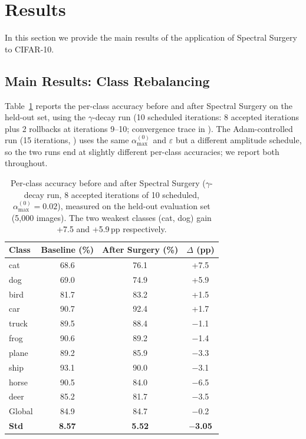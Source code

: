 \documentclass[11pt,a4paper]{article}
\begin{document}
\newpage

\section{Results}
\label{sec:results}

In this section we provide the main results of the application of Spectral Surgery to CIFAR-10.

\subsection{Main Results: Class Rebalancing}

Table~\ref{tab:main-results} reports the per-class accuracy before and
after Spectral Surgery on the held-out set, using the
$\gamma$-decay run (10 scheduled iterations: 8 accepted iterations
plus 2 rollbacks at iterations 9--10; convergence trace in
). The Adam-controlled run (15 iterations,
) uses the same $\alpha_{\max}^{(0)}$ and
$\varepsilon$ but a different amplitude schedule, so the two runs
end at slightly different per-class accuracies; we report both
throughout.

\begin{table}[ht]
\centering
\caption{Per-class accuracy before and after Spectral Surgery
($\gamma$-decay run, 8 accepted iterations of 10 scheduled,
$\alpha_{\max}^{(0)} = 0.02$), measured on the held-out
evaluation set (5,000 images). The two weakest classes (cat, dog)
gain +7.5 and +5.9\,pp respectively.}
\label{tab:main-results}

{
\fontsize{12pt}{12pt}\selectfont     %
\renewcommand{\arraystretch}{1} %
\setlength{\tabcolsep}{5pt}        %

\begin{tabular}{lccc}
\toprule
Class & Baseline (\%) & After Surgery (\%) & $\Delta$ (pp) \\
\midrule
cat   & 68.6 & 76.1 & +7.5 \\
dog   & 69.0 & 74.9 & +5.9 \\
bird  & 81.7 & 83.2 & +1.5 \\
car   & 90.7 & 92.4 & +1.7 \\
truck & 89.5 & 88.4 & $-$1.1 \\
frog  & 90.6 & 89.2 & $-$1.4 \\
plane & 89.2 & 85.9 & $-$3.3 \\
ship  & 93.1 & 90.0 & $-$3.1 \\
horse & 90.5 & 84.0 & $-$6.5 \\
deer  & 85.2 & 81.7 & $-$3.5 \\
\midrule
Global & 84.9 & 84.7 & $\bm{-}$0.2 \\
\textbf{Std} & \textbf{8.57} & \textbf{5.52} & $\bm{-}$\textbf{3.05} \\
\bottomrule
\end{tabular}

}

\end{table}
\end{document}
